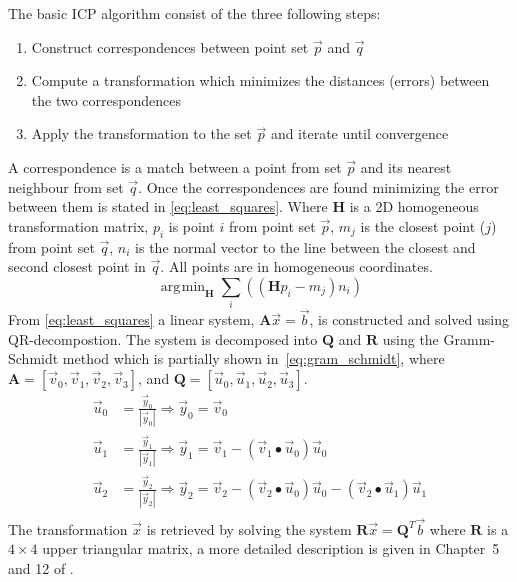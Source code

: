 \documentclass[preprint]{sigplanconf}
\DeclareMathOperator*{\argmin}{\arg\!\min} %
\begin{document}
The basic ICP algorithm consist of the three following steps:
\begin{enumerate}
\item Construct correspondences between point set $\vec{p}$ and $\vec{q}$
\item Compute a transformation which minimizes the distances (errors) between the two correspondences
\item Apply the transformation to the set $\vec{p}$ and iterate until convergence
\end{enumerate}
A correspondence is a match between a point from set $\vec{p}$ and its nearest neighbour from set $\vec{q}$. 
Once the correspondences are found minimizing the error between them is stated in \eqref{eq:least_squares}.
Where $\mathbf{H}$ is a 2D homogeneous transformation matrix, $p_i$ is point $i$ from point set $\vec{p}$, $m_j$ is the closest point ($j$) from point set $\vec{q}$, $n_i$ is the normal vector to the line between the closest and second closest point in $\vec{q}$.
All points are in homogeneous coordinates.
\begin{equation}
\argmin_{\mathbf{H}} \sum_i ((\mathbf{H}p_i - m_j)n_i)
\label{eq:least_squares} 
\end{equation}
From \eqref{eq:least_squares} a linear system, $\mathbf{A}\vec{x}=\vec{b}$, is constructed and solved using QR-decompostion. The system is decomposed into $\mathbf{Q}$ and $\mathbf{R}$ using the Gramm-Schmidt method which is partially shown in~\eqref{eq:gram_schmidt}, where $\mathbf{A} = [\vec{v}_0,\vec{v}_1,\vec{v}_2,\vec{v}_3]$, and $\mathbf{Q} = [\vec{u}_0,\vec{u}_1,\vec{u}_2,\vec{u}_3]$.
\begin{equation}
\label{eq:gram_schmidt}
\begin{aligned}
\vec{u}_0 &= \frac{\vec{y}_0}{|\vec{y}_0|} \Rightarrow \vec{y}_0 = \vec{v}_0 \\
\vec{u}_1 &= \frac{\vec{y}_1}{|\vec{y}_1|} \Rightarrow \vec{y}_1 = \vec{v}_1 - (\vec{v}_1 \bullet \vec{u}_0)\vec{u}_0 \\
\vec{u}_2 &= \frac{\vec{y}_2}{|\vec{y}_2|} \Rightarrow \vec{y}_2 = \vec{v}_2 - (\vec{v}_2 \bullet \vec{u}_0)\vec{u}_0  - (\vec{v}_2 \bullet \vec{u}_1)\vec{u}_1 \\
\end{aligned}
\end{equation}
The transformation $\vec{x}$ is retrieved by solving the system $\mathbf{R}\vec{x}=\mathbf{Q}^T \vec{b}$ where $\mathbf{R}$ is a $4 \times 4$ upper triangular matrix, a more detailed description is given in Chapter~5 and 12 of \cite{Robin:Hendrik}.
\end{document}
